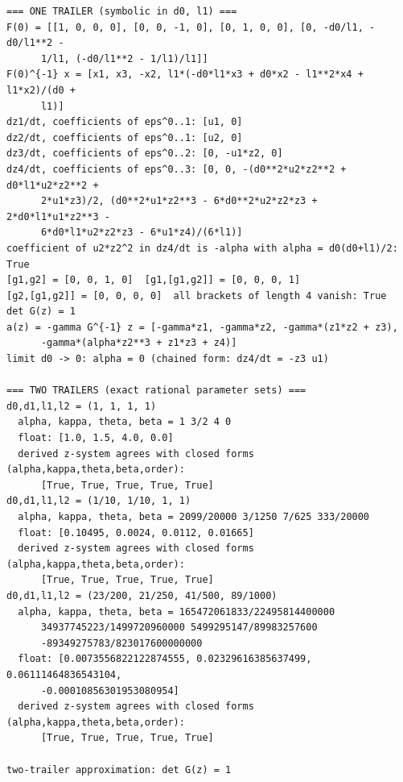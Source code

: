 {\footnotesize\begin{verbatim}
=== ONE TRAILER (symbolic in d0, l1) ===
F(0) = [[1, 0, 0, 0], [0, 0, -1, 0], [0, 1, 0, 0], [0, -d0/l1, -d0/l1**2 -
      1/l1, (-d0/l1**2 - 1/l1)/l1]]
F(0)^{-1} x = [x1, x3, -x2, l1*(-d0*l1*x3 + d0*x2 - l1**2*x4 + l1*x2)/(d0 +
      l1)]
dz1/dt, coefficients of eps^0..1: [u1, 0]
dz2/dt, coefficients of eps^0..1: [u2, 0]
dz3/dt, coefficients of eps^0..2: [0, -u1*z2, 0]
dz4/dt, coefficients of eps^0..3: [0, 0, -(d0**2*u2*z2**2 + d0*l1*u2*z2**2 +
      2*u1*z3)/2, (d0**2*u1*z2**3 - 6*d0**2*u2*z2*z3 + 2*d0*l1*u1*z2**3 -
      6*d0*l1*u2*z2*z3 - 6*u1*z4)/(6*l1)]
coefficient of u2*z2^2 in dz4/dt is -alpha with alpha = d0(d0+l1)/2: True
[g1,g2] = [0, 0, 1, 0]  [g1,[g1,g2]] = [0, 0, 0, 1]
[g2,[g1,g2]] = [0, 0, 0, 0]  all brackets of length 4 vanish: True
det G(z) = 1
a(z) = -gamma G^{-1} z = [-gamma*z1, -gamma*z2, -gamma*(z1*z2 + z3),
      -gamma*(alpha*z2**3 + z1*z3 + z4)]
limit d0 -> 0: alpha = 0 (chained form: dz4/dt = -z3 u1)

=== TWO TRAILERS (exact rational parameter sets) ===
d0,d1,l1,l2 = (1, 1, 1, 1)
  alpha, kappa, theta, beta = 1 3/2 4 0
  float: [1.0, 1.5, 4.0, 0.0]
  derived z-system agrees with closed forms (alpha,kappa,theta,beta,order):
      [True, True, True, True, True]
d0,d1,l1,l2 = (1/10, 1/10, 1, 1)
  alpha, kappa, theta, beta = 2099/20000 3/1250 7/625 333/20000
  float: [0.10495, 0.0024, 0.0112, 0.01665]
  derived z-system agrees with closed forms (alpha,kappa,theta,beta,order):
      [True, True, True, True, True]
d0,d1,l1,l2 = (23/200, 21/250, 41/500, 89/1000)
  alpha, kappa, theta, beta = 165472061833/22495814400000
      34937745223/1499720960000 5499295147/89983257600
      -89349275783/823017600000000
  float: [0.0073556822122874555, 0.02329616385637499, 0.06111464836543104,
      -0.00010856301953080954]
  derived z-system agrees with closed forms (alpha,kappa,theta,beta,order):
      [True, True, True, True, True]

two-trailer approximation: det G(z) = 1
\end{verbatim}}
